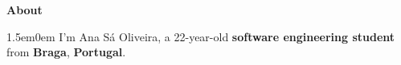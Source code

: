\noindent\textbf{About}
\noindent\hrulefill
\vspace{0.25em}
\begin{adjustwidth}{1.5em}{0em}
I'm Ana Sá Oliveira, a 22-year-old
\textbf{software engineering student} from \textbf{Braga}, \textbf{Portugal}.
\end{adjustwidth}
\vspace{0.25em}